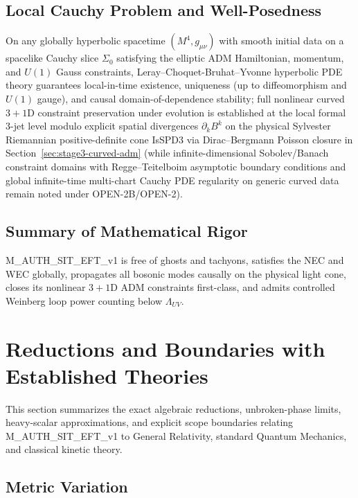 \documentclass[american,11pt,letterpaper]{article}
\def\mathcal#1{#1}%
\def\mathrm#1{#1}%
\def\texttt#1{#1}%
\begin{document}
\subsection{Local Cauchy Problem and Well-Posedness}

On any globally hyperbolic spacetime $(\mathcal{M}^4, g_{\mu\nu})$ with smooth initial data on a spacelike Cauchy slice $\Sigma_0$ satisfying the elliptic ADM Hamiltonian, momentum, and $U(1)$ Gauss constraints, Leray--Choquet-Bruhat--Yvonne hyperbolic PDE theory guarantees local-in-time existence, uniqueness (up to diffeomorphism and $U(1)$ gauge), and causal domain-of-dependence stability; full nonlinear curved $3+1$D constraint preservation under evolution is established at the local formal 3-jet level modulo explicit spatial divergences $\partial_k B^k$ on the physical Sylvester Riemannian positive-definite cone \texttt{IsSPD3} via Dirac--Bergmann Poisson closure in Section~\ref{sec:stage3-curved-adm} (while infinite-dimensional Sobolev/Banach constraint domains with Regge--Teitelboim asymptotic boundary conditions and global infinite-time multi-chart Cauchy PDE regularity on generic curved data remain noted under \texttt{OPEN-2B}/\texttt{OPEN-2}).

\subsection{Summary of Mathematical Rigor}

\texttt{M\_AUTH\_SIT\_EFT\_v1} is free of ghosts and tachyons, satisfies the NEC and WEC globally, propagates all bosonic modes causally on the physical light cone, closes its nonlinear $3+1$D ADM constraints first-class, and admits controlled Weinberg loop power counting below $\Lambda_{\mathrm{UV}}$.

\section{Reductions and Boundaries with Established Theories}
\label{app:reductions}

This section summarizes the exact algebraic reductions, unbroken-phase limits, heavy-scalar approximations, and explicit scope boundaries relating \texttt{M\_AUTH\_SIT\_EFT\_v1} to General Relativity, standard Quantum Mechanics, and classical kinetic theory.

\subsection{Metric Variation}
\end{document}
